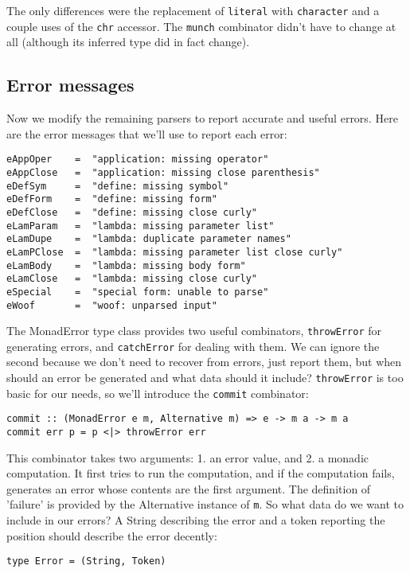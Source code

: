 \documentclass{tmr}
\begin{document}
The only differences were the replacement of \verb+literal+ with \verb+character+ 
and a couple uses of the \verb+chr+ accessor.  The \verb+munch+ combinator didn't 
have to change at all (although its inferred type did in fact change).

\subsection{Error messages}
Now we modify the remaining parsers to report accurate and useful errors.
Here are the error messages that we'll use to report each error:
\begin{verbatim}
eAppOper    =  "application: missing operator"
eAppClose   =  "application: missing close parenthesis"
eDefSym     =  "define: missing symbol"
eDefForm    =  "define: missing form"
eDefClose   =  "define: missing close curly"
eLamParam   =  "lambda: missing parameter list"
eLamDupe    =  "lambda: duplicate parameter names"
eLamPClose  =  "lambda: missing parameter list close curly"
eLamBody    =  "lambda: missing body form"
eLamClose   =  "lambda: missing close curly"
eSpecial    =  "special form: unable to parse"
eWoof       =  "woof: unparsed input"
\end{verbatim}

The MonadError type class provides two useful combinators, \verb+throwError+ for 
generating errors, and \verb+catchError+ for dealing with them.  We can ignore 
the second because we don't need to recover from errors, just report them, 
but when should an error be generated and what 
data should it include?  \verb+throwError+ is too basic for our needs, so we'll 
introduce the \verb+commit+ combinator:
\begin{verbatim}
commit :: (MonadError e m, Alternative m) => e -> m a -> m a
commit err p = p <|> throwError err
\end{verbatim}

This combinator takes two arguments: 1. an error value, and 2. a monadic 
computation.  It first tries to run the computation, and if the computation 
fails, generates an error whose contents are the first argument.  The 
definition of 'failure' is provided by the Alternative instance of \verb+m+. So 
what data do we want to include in our errors?  A String describing the error 
and a token reporting the position should describe the error decently:
\begin{verbatim}
type Error = (String, Token)
\end{verbatim}
\end{document}
